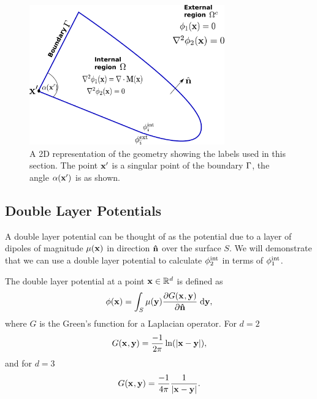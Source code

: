 \begin{figure}
  \center
  \includegraphics[width=0.75\textwidth]{./images/BEM-geometry}




  \caption{A 2D representation of the geometry showing the labels used in this section. The point $\mathbf{x}'$ is a singular point of the boundary ${\Gamma}$, the angle $\alpha(\mathbf{x}')$ is as shown.}
  \label{fig:BEM-geometry}
\end{figure}

\subsection{Double Layer Potentials}
\label{sec:double-layer-potent}
A double layer potential can be thought of as the potential due to a layer of dipoles of magnitude $\mu(\mathbf{x})$ in direction $\mathbf{\hat{n}}$ over the surface $S$.\cite{Sternberg1946} We will demonstrate that we can use a double layer potential to calculate $\phi^{\text{int}}_2$ in terms of $\phi^{\text{int}}_1$.

The double layer potential at a point $\mathbf{x} \in \mathbb{R}^d$ is defined as \cite{eom_double_layer_potential}
\begin{equation}
  \label{eq:3}
  \phi(\mathbf{x}) = \int_{S} \mu(\mathbf{y}) \frac{\partial G(\mathbf{x}_{},\mathbf{y})}{\partial \mathbf{\hat{n}}} {\; \text{d}} \mathbf{y},
\end{equation}
where $G$ is the Green's function for a Laplacian operator.
For $d=2$
\[ G(\mathbf{x}_{},\mathbf{y}) = \dfrac{-1}{2\pi}\ln(\lvert \mathbf{x} - \mathbf{y} \rvert), \]
and for $d=3$
\begin{equation} G(\mathbf{x}_{},\mathbf{y}) = \dfrac{-1}{4 \pi} \dfrac{1}{\lvert \mathbf{x} - \mathbf{y} \rvert}.
  \label{eqn:greenslaplacian3d}
\end{equation}


